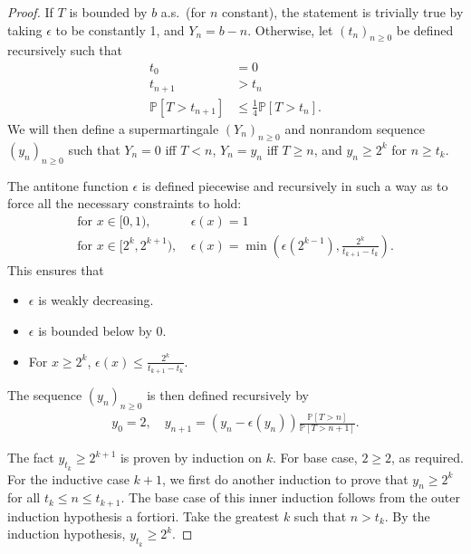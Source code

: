 \begin{proof}

If $T$ is bounded by $b$ a.s.~(for $n$ constant), the statement is trivially true by taking $\epsilon$ to be constantly 1, and $Y_n = b - n$.
Otherwise, let $(t_n)_{n \geq 0}$ be defined recursively such that 
\begin{align*}
t_0 &= 0\\
t_{n+1} &> t_n\\
\mathbb P[T > t_{n+1}] &\leq \frac 1 4 \mathbb P[T > t_n].
\end{align*}
We will then define a supermartingale $(Y_n)_{n \geq 0}$ and nonrandom sequence $(y_n)_{n \geq 0}$ such that $Y_n = 0$ iff $T < n$, $Y_n = y_n$ iff $T \geq n$, and $y_n \geq 2^k$ for $n \geq t_k$.

The antitone function $\epsilon$ is defined piecewise and recursively in such a way as to force all the necessary constraints to hold:
\begin{align*}
    \text{for }x \in [0,1),\ &\epsilon(x) = 1 \\
    \text{for }x \in [2^k,2^{k+1}),\ &\epsilon(x) = \min \left (\epsilon(2^{k-1}), \frac{2^k}{t_{k+1}-t_k} \right ).
\end{align*}
This ensures that
\begin{itemize}
\item $\epsilon$ is weakly decreasing. 
\item $\epsilon$ is bounded below by 0.
\item For $x \geq 2^k$, $\epsilon(x) \leq \frac{2^k}{t_{k+1}-t_k}$. 
\end{itemize}

The sequence $(y_n)_{n \geq 0}$ is then defined recursively by
\begin{align*}
    y_0 = 2, \quad
    y_{n+1} = (y_n - \epsilon(y_n)) \frac{\mathbb P[T > n]}{\mathbb P[T > n+1]}.
\end{align*}

The fact $y_{t_k} \geq 2^{k+1}$ is proven by induction on $k$. For base case, $2 \geq 2$, as required. For the inductive case $k+1$, we first do another induction to prove that $y_n \geq 2^k$ for all $t_k \leq n \leq t_{k+1}$. The base case of this inner induction follows from the outer induction hypothesis a fortiori. Take the greatest $k$ such that $n > t_k$. By the induction hypothesis, $y_{t_k} \geq 2^k$.


\end{proof}
